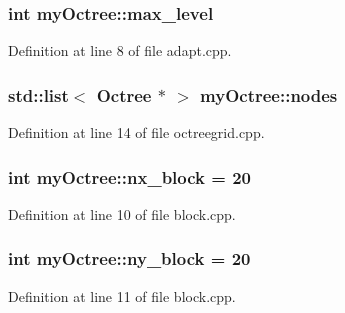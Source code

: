 \hypertarget{namespacemy_octree_ae2a304436a1b08f28c93d8e54026c8bb}{}
\subsubsection[{max\+\_\+level}]{\setlength{\rightskip}{0pt plus 5cm}int my\+Octree\+::max\+\_\+level}\label{namespacemy_octree_ae2a304436a1b08f28c93d8e54026c8bb}


Definition at line 8 of file adapt.\+cpp.

\hypertarget{namespacemy_octree_a8c21e6b5a77ff973d7422aeb09230f2d}{}
\subsubsection[{nodes}]{\setlength{\rightskip}{0pt plus 5cm}std\+::list$<$ {\bf Octree} $\ast$ $>$ my\+Octree\+::nodes}\label{namespacemy_octree_a8c21e6b5a77ff973d7422aeb09230f2d}


Definition at line 14 of file octreegrid.\+cpp.

\hypertarget{namespacemy_octree_a7f30e98430213a41919e16e40abc2078}{}
\subsubsection[{nx\+\_\+block}]{\setlength{\rightskip}{0pt plus 5cm}int my\+Octree\+::nx\+\_\+block = 20}\label{namespacemy_octree_a7f30e98430213a41919e16e40abc2078}


Definition at line 10 of file block.\+cpp.

\hypertarget{namespacemy_octree_a39784fe68930da363b3ad335a47bed19}{}
\subsubsection[{ny\+\_\+block}]{\setlength{\rightskip}{0pt plus 5cm}int my\+Octree\+::ny\+\_\+block = 20}\label{namespacemy_octree_a39784fe68930da363b3ad335a47bed19}


Definition at line 11 of file block.\+cpp.

\hypertarget{namespacemy_octree_a2b2fa3a7759c3ff5b129847af3e09cc3}{}
